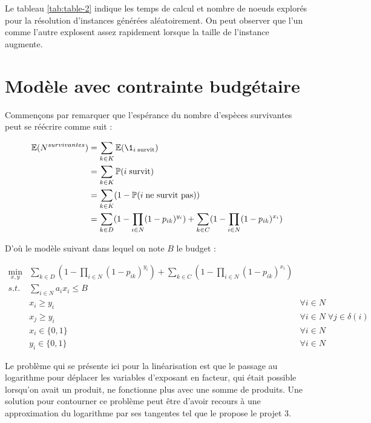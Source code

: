 \documentclass[12pt]{extarticle}
\begin{document}
Le tableau \ref{tab:table-2} indique les temps de calcul et nombre de noeuds explorés pour la résolution d'instances générées aléatoirement.
On peut observer que l'un comme l'autre explosent assez rapidement lorsque la taille de l'instance augmente.

\section{Modèle avec contrainte budgétaire}

Commençons par remarquer que l'espérance du nombre d'espèces survivantes peut se réécrire comme suit : 

\begin{align*}
    \mathbb{E}(N^{survivantes}) &= \sum_{k \in K} \mathbb{E}(\1_{i \; \text{survit}}) \\
                                &= \sum_{k \in K} \mathbb{P}(i \; \text{survit})\\
                                &= \sum_{k \in K} (1 - \mathbb{P}(i \; \text{ne survit pas}))\\
                                &= \sum_{k \in D} (1 - \prod_{i \in N}(1 - p_{ik})^{y_i}) + \sum_{k \in C} (1 - \prod_{i \in N}(1 - p_{ik})^{x_i})\\
\end{align*}

D'où le modèle suivant dans lequel on note $B$ le budget :

\begin{align*}
    \min_{x, y} &\sum_{k \in D} (1 - \prod_{i \in N}(1 - p_{ik})^{y_i}) + \sum_{k \in C} (1 - \prod_{i \in N}(1 - p_{ik})^{x_i})&\\
    s.t.   & \sum_{i \in N} a_i x_i \leq B & \\
           & x_i \geq y_i       & \forall i \in N\\
           & x_j \geq y_i       & \forall i \in N \; \forall j \in \delta(i)\\
           & x_i \in \{0, 1\}   & \forall i \in N\\
           & y_i \in \{0, 1\}   & \forall i \in N
\end{align*}

Le problème qui se présente ici pour la linéarisation est que le passage au logarithme pour déplacer les variables d'exposant en facteur, qui était possible lorsqu'on avait un produit, ne fonctionne plus avec une somme de produits.
Une solution pour contourner ce problème peut être d'avoir recours à une approximation du logarithme par ses tangentes tel que le propose le projet 3.
\end{document}
